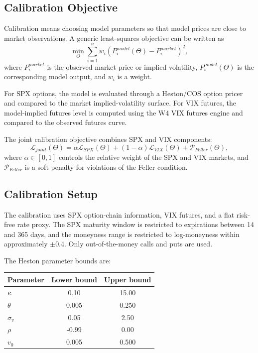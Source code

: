 \subsection{Calibration Objective}

Calibration means choosing model parameters so that model prices are close to market observations. A generic least-squares objective can be written as
\begin{equation}
\min_{\Theta}
\sum_{i=1}^{n}
w_i
\left(
P_i^{model}(\Theta)
-
P_i^{market}
\right)^2,
\end{equation}
where \(P_i^{market}\) is the observed market price or implied volatility, \(P_i^{model}(\Theta)\) is the corresponding model output, and \(w_i\) is a weight.

For SPX options, the model is evaluated through a Heston/COS option pricer and compared to the market implied-volatility surface. For VIX futures, the model-implied futures level is computed using the W4 VIX futures engine and compared to the observed futures curve.

The joint calibration objective combines SPX and VIX components:
\begin{equation}
\mathcal{L}_{joint}(\Theta)
=
\alpha \mathcal{L}_{SPX}(\Theta)
+
(1-\alpha)\mathcal{L}_{VIX}(\Theta)
+
\mathcal{P}_{Feller}(\Theta),
\end{equation}
where \(\alpha\in[0,1]\) controls the relative weight of the SPX and VIX markets, and \(\mathcal{P}_{Feller}\) is a soft penalty for violations of the Feller condition.

\subsection{Calibration Setup}

The calibration uses SPX option-chain information, VIX futures, and a flat risk-free rate proxy. The SPX maturity window is restricted to expirations between 14 and 365 days, and the moneyness range is restricted to log-moneyness within approximately \(\pm 0.4\). Only out-of-the-money calls and puts are used.

The Heston parameter bounds are:
\begin{center}
\begin{tabular}{lcc}
\toprule
Parameter & Lower bound & Upper bound \\
\midrule
\(\kappa\) & 0.10 & 15.00 \\
\(\theta\) & 0.005 & 0.250 \\
\(\sigma_v\) & 0.05 & 2.50 \\
\(\rho\) & -0.99 & 0.00 \\
\(v_0\) & 0.005 & 0.500 \\
\bottomrule
\end{tabular}
\end{center}


